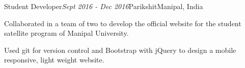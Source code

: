 \begin{rSubsection}{Student Developer}{\em Sept 2016 - Dec 2016}{Parikshit}{Manipal, India}
    \item Collaborated in a team of two to develop the official website for the student satellite program of Manipal University.
    \item Used git for version control and Bootstrap with jQuery to design a mobile responsive, light weight website. 
\end{rSubsection}